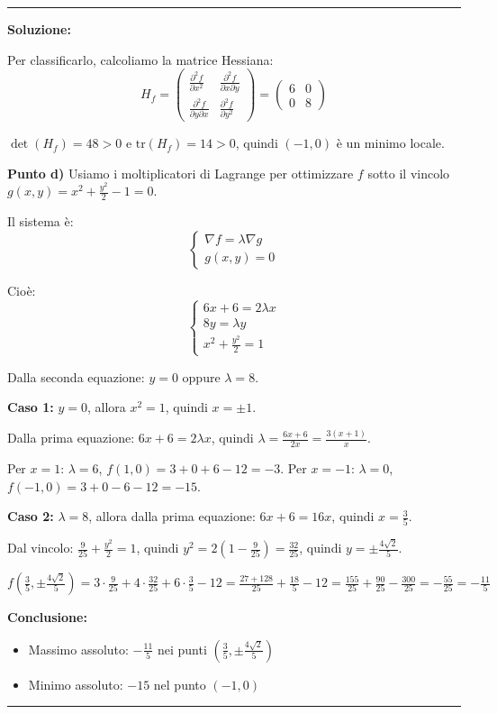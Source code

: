 \documentclass[12pt, a4paper]{article}
\newenvironment{solution}
{\par\noindent\rule{\textwidth}{0.4pt}\par\textbf{Soluzione:}\medskip\par}
{\par\rule{\textwidth}{0.4pt}\par\bigskip}
\begin{document}
\begin{solution}
Per classificarlo, calcoliamo la matrice Hessiana:
\[
H_f = \begin{pmatrix}
\frac{\partial^2 f}{\partial x^2} & \frac{\partial^2 f}{\partial x \partial y} \\
\frac{\partial^2 f}{\partial y \partial x} & \frac{\partial^2 f}{\partial y^2}
\end{pmatrix} = \begin{pmatrix}
6 & 0 \\
0 & 8
\end{pmatrix}
\]

$\det(H_f) = 48 > 0$ e $\text{tr}(H_f) = 14 > 0$, quindi $(-1, 0)$ è un minimo locale.

\vspace{0.5cm}

\textbf{Punto d)} Usiamo i moltiplicatori di Lagrange per ottimizzare $f$ sotto il vincolo $g(x,y) = x^2 + \frac{y^2}{2} - 1 = 0$.

Il sistema è:
\[
\begin{cases}
\nabla f = \lambda \nabla g \\
g(x,y) = 0
\end{cases}
\]

Cioè:
\[
\begin{cases}
6x + 6 = 2\lambda x \\
8y = \lambda y \\
x^2 + \frac{y^2}{2} = 1
\end{cases}
\]

Dalla seconda equazione: $y = 0$ oppure $\lambda = 8$.

\textbf{Caso 1:} $y = 0$, allora $x^2 = 1$, quindi $x = \pm 1$.

Dalla prima equazione: $6x + 6 = 2\lambda x$, quindi $\lambda = \frac{6x + 6}{2x} = \frac{3(x + 1)}{x}$.

Per $x = 1$: $\lambda = 6$, $f(1, 0) = 3 + 0 + 6 - 12 = -3$.
Per $x = -1$: $\lambda = 0$, $f(-1, 0) = 3 + 0 - 6 - 12 = -15$.

\textbf{Caso 2:} $\lambda = 8$, allora dalla prima equazione: $6x + 6 = 16x$, quindi $x = \frac{3}{5}$.

Dal vincolo: $\frac{9}{25} + \frac{y^2}{2} = 1$, quindi $y^2 = 2\left(1 - \frac{9}{25}\right) = \frac{32}{25}$, quindi $y = \pm\frac{4\sqrt{2}}{5}$.

$f\left(\frac{3}{5}, \pm\frac{4\sqrt{2}}{5}\right) = 3 \cdot \frac{9}{25} + 4 \cdot \frac{32}{25} + 6 \cdot \frac{3}{5} - 12 = \frac{27 + 128}{25} + \frac{18}{5} - 12 = \frac{155}{25} + \frac{90}{25} - \frac{300}{25} = -\frac{55}{25} = -\frac{11}{5}$

\textbf{Conclusione:}
\begin{itemize}
    \item Massimo assoluto: $-\frac{11}{5}$ nei punti $\left(\frac{3}{5}, \pm\frac{4\sqrt{2}}{5}\right)$
    \item Minimo assoluto: $-15$ nel punto $(-1, 0)$
\end{itemize}
\end{solution}
\end{document}
